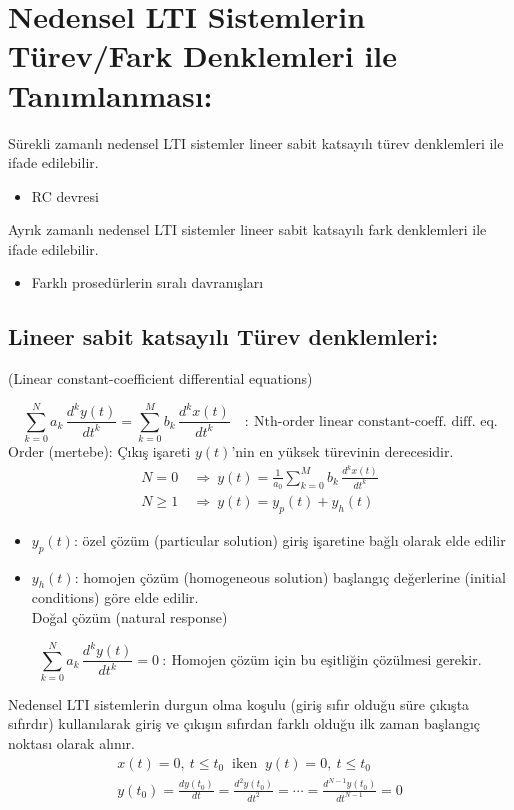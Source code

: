 \documentclass[11pt,a4paper]{article}
\begin{document}
\section{Nedensel LTI Sistemlerin Türev/Fark Denklemleri ile Tanımlanması:}
Sürekli zamanlı nedensel LTI sistemler lineer sabit katsayılı türev denklemleri ile ifade edilebilir.
\begin{itemize}[label=--]
  \item RC devresi
\end{itemize}
Ayrık zamanlı nedensel LTI sistemler lineer sabit katsayılı fark denklemleri ile ifade edilebilir.
\begin{itemize}[label=--]
  \item Farklı prosedürlerin sıralı davranışları
\end{itemize}

\subsection{Lineer sabit katsayılı Türev denklemleri:}
(Linear constant-coefficient differential equations)

\[ \sum_{k=0}^{N} a_k\,\frac{d^k y(t)}{dt^k} = \sum_{k=0}^{M} b_k\,\frac{d^k x(t)}{dt^k} \quad : \ \text{Nth-order linear constant-coeff. diff. eq.} \]
Order (mertebe): Çıkış işareti $y(t)$'nin en yüksek türevinin derecesidir.
\begin{align*}
  N = 0 \ &\Rightarrow\ y(t) = \frac{1}{a_0}\sum_{k=0}^{M} b_k\,\frac{d^k x(t)}{dt^k} \\
  N \geq 1 \ &\Rightarrow\ y(t) = y_p(t) + y_h(t)
\end{align*}
\begin{itemize}[label={}, leftmargin=1.5em]
  \item $y_p(t)$: özel çözüm (particular solution) giriş işaretine bağlı olarak elde edilir
  \item $y_h(t)$: homojen çözüm (homogeneous solution) başlangıç değerlerine (initial conditions) göre elde edilir.\\
  \phantom{$y_h(t)$: }Doğal çözüm (natural response)
\end{itemize}
\[ \sum_{k=0}^{N} a_k\,\frac{d^k y(t)}{dt^k} = 0 \ : \ \text{Homojen çözüm için bu eşitliğin çözülmesi gerekir.} \]

Nedensel LTI sistemlerin durgun olma koşulu (giriş sıfır olduğu süre çıkışta sıfırdır) kullanılarak giriş ve çıkışın sıfırdan farklı olduğu ilk zaman başlangıç noktası olarak alınır.
\begin{gather*}
  x(t) = 0, \ t \leq t_0 \ \text{ iken } \ y(t) = 0, \ t \leq t_0 \\
  y(t_0) = \frac{dy(t_0)}{dt} = \frac{d^2 y(t_0)}{dt^2} = \cdots = \frac{d^{N-1} y(t_0)}{dt^{N-1}} = 0
\end{gather*}
\end{document}
